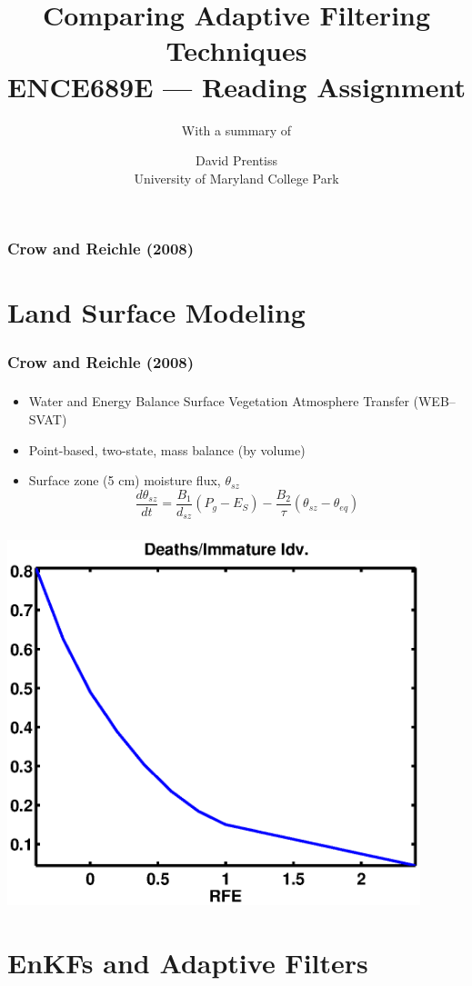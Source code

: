 \documentclass[mathserif]{beamer}
\begin{document}
\nobibliography*
\title{Comparing Adaptive Filtering Techniques \\ ENCE689E --- Reading Assignment}
\author{David Prentiss \\ University of Maryland College Park}
\subtitle{With a summary of \\ }

\frame{\titlepage}

\begin{frame}
  \frametitle{Crow and Reichle (2008)}
  \tableofcontents
\end{frame}

\section{Land Surface Modeling}

\begin{frame}
  \frametitle{Crow and Reichle (2008)}
  \tableofcontents[currentsection]
\end{frame}

\begin{frame}
  \frametitle{\insertsection}
  \begin{itemize}
    \item Water and Energy Balance Surface Vegetation Atmosphere Transfer (WEB--SVAT)
    \item Point-based, two-state, mass balance (by volume)
    \item Surface zone (5 cm) moisture flux, $\theta_{sz}$
      \begin{equation}
        \frac{d\theta_{sz}}{dt}=\frac{B_1}{d_{sz}}\left(P_g - E_S\right)-\frac{B_2}{\tau}\left(\theta_{sz}-\theta_{eq}\right)
      \end{equation}
  \end{itemize}
\end{frame}

\begin{frame}
\begin{center}
  \frametitle{\insertsection}
  \includegraphics[width=0.9\textwidth]{mortMat}
\end{center}
\end{frame}

\section{EnKFs and Adaptive Filters}



\end{document}

